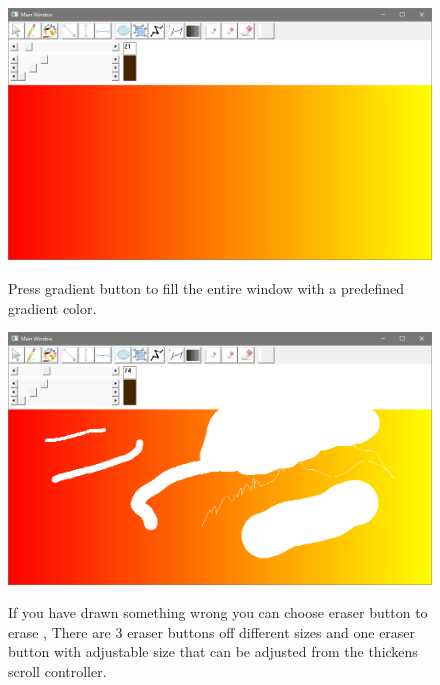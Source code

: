 \begin{figure}[h!]
  \centering
    {%
      \includegraphics[width=1\textwidth]{14}}
  \caption{Press gradient button to fill the entire window with a predefined gradient color. }
\end{figure}

\begin{figure}[h!]
  \centering
    {%
      \includegraphics[width=1\textwidth]{15}}
  \caption{If you have drawn something wrong you can choose eraser button to erase , There are 3 eraser buttons off different sizes and one eraser button with adjustable size that can be adjusted from the thickens scroll controller.}
\end{figure}

